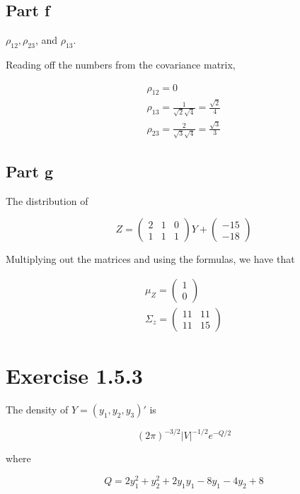 \documentclass{article}
\begin{document}
\subsection*{Part f}

$\rho_{12}, \rho_{23}$, and $\rho_{13}$.

Reading off the numbers from the covariance matrix,

\begin{gather*}
\rho_{12} = 0 \\
\rho_{13} = \frac{1}{\sqrt{2}\sqrt{4}} = \frac{\sqrt{2}}{4} \\
\rho_{23} = \frac{2}{\sqrt{3}\sqrt{4}} = \frac{\sqrt{3}}{3}
\end{gather*}

\subsection*{Part g}

The distribution of

\[
Z = \begin{pmatrix}2 & 1 & 0 \\
1 & 1 & 1 \end{pmatrix}
Y+
\begin{pmatrix}
-15 \\ -18
\end{pmatrix}
\]

Multiplying out the matrices and using the formulas, we have that

\begin{gather*}
\mu_Z = \begin{pmatrix}1 \\ 0\end{pmatrix} \\
\Sigma_z = \begin{pmatrix} 11 & 11 \\ 11 & 15 \end{pmatrix}
\end{gather*}

\section*{Exercise 1.5.3}

The density of $Y = (y_1, y_2, y_3)'$ is

\[
(2\pi)^{-3/2}|V|^{-1/2}e^{-Q/2}
\]

where

\[
Q=2y_1^2 + y_2^2 + 2y_1y_1 - 8y_1 - 4y_2 + 8
\]
\end{document}
